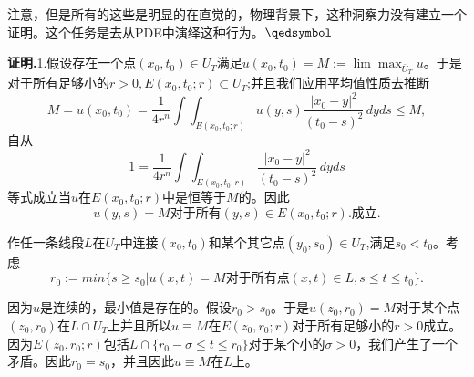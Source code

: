 \documentclass[leqno]{article}
\numberwithin{equation}{subsection}%
\begin{document}
\par
注意，但是所有的这些是明显的在直觉的，物理背景下，这种洞察力没有建立一个证明。这个任务是去从PDE中演绎这种行为。$\hfill\qedsymbol$
\par
\noindent\textbf{证明.}1.假设存在一个点$(x_{0},t_{0})\in U_{T}$满足$u(x_{0},t_{0})=M:=\lim\max_{\bar{U}_{T}}u$。于是对于所有足够小的$r>0,E(x_{0},t_{0};r)\subset U_{T}$;并且我们应用平均值性质去推断
\begin{equation*}
M=u(x_{0},t_{0})=\frac{1}{4r^{n}}\int\!\int_{E(x_{0},t_{0};r)}u(y,s)\frac{|x_{0}-y|^{2}}{(t_{0}-s)^{2}}\,dyds\leq M,
\end{equation*}
自从
\begin{equation*}
1=\frac{1}{4r^{n}}\int\!\int_{E(x_{0},t_{0};r)}\frac{|x_{0}-y|^{2}}{(t_{0}-s)^{2}}\,dyds
\end{equation*}
等式成立当$u$在$E(x_{0},t_{0};r)$中是恒等于$M$的。因此
\begin{equation*}
u(y,s)=M\text{对于所有}(y,s)\in E(x_{0},t_{0};r).\text{成立.}
\end{equation*}
\par
作任一条线段$L$在$U_{T}$中连接$(x_{0},t_{0})$和某个其它点$(y_{0},s_{0})\in U_{T}$,满足$s_{0}<t_{0}$。考虑
\begin{equation*}
r_{0}:=min\{s\geq s_{0}|u(x,t)=M\text{对于所有点}(x,t)\in L,s\leq t\leq t_{0}\}.
\end{equation*}
\par
因为$u$是连续的，最小值是存在的。假设$r_{0}>s_{0}$。于是$u(z_{0},r_{0})=M$对于某个点$(z_{0},r_{0})$在$L\cap U_{T}$上并且所以$u\equiv M$在$E(z_{0},r_{0};r)$对于所有足够小的$r>0$成立。因为$E(z_{0},r_{0};r)$包括$L\cap \{r_{0}-\sigma\leq t\leq r_{0}\}$对于某个小的$\sigma>0$，我们产生了一个矛盾。因此$r_{0}=s_{0}$，并且因此$u\equiv M$在$L$上。
\par
\end{document}

